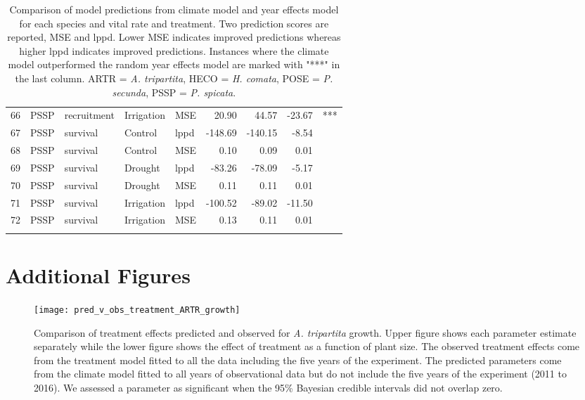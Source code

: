 \documentclass[11pt]{article}
\begin{document}
\begin{longtable}{rllllrrrl}
	66 & PSSP & recruitment & Irrigation & MSE & 20.90 & 44.57 & -23.67 & *** \\ 
	67 & PSSP & survival & Control & lppd & -148.69 & -140.15 & -8.54 &  \\ 
	68 & PSSP & survival & Control & MSE & 0.10 & 0.09 & 0.01 &  \\ 
	69 & PSSP & survival & Drought & lppd & -83.26 & -78.09 & -5.17 &  \\ 
	70 & PSSP & survival & Drought & MSE & 0.11 & 0.11 & 0.01 &  \\ 
	71 & PSSP & survival & Irrigation & lppd & -100.52 & -89.02 & -11.50 &  \\ 
	72 & PSSP & survival & Irrigation & MSE & 0.13 & 0.11 & 0.01 &  \\ 
	\hline
	\caption{Comparison of model predictions from climate model and year effects model for each species and vital rate and treatment.  Two prediction scores are reported, MSE and lppd. Lower MSE indicates improved predictions whereas higher lppd indicates improved predictions.  Instances where the climate model outperformed the random year effects model are marked with "***" in the last column. ARTR = \textit{A. tripartita}, HECO = \textit{H. comata}, POSE = \textit{P. secunda}, PSSP = \textit{P. spicata}.} 
	\label{table:treatmentPreds}
\end{longtable}


\clearpage
\newpage
\clearpage
\newpage
\section{Additional Figures} 

\begin{figure}[!htbp]
	\centering
	\texttt{[image: pred\_v\_obs\_treatment\_ARTR\_growth]}
	\caption{Comparison of treatment effects predicted and observed for \textit{A. tripartita} growth.  Upper figure shows each parameter estimate separately while the lower figure shows the effect of treatment as a function of plant size.  The observed treatment effects come from the treatment model fitted to all the data including the five years of the experiment.  The predicted parameters come from the climate model fitted to all years of observational data but do not include the five years of the experiment (2011 to 2016). We assessed a parameter as significant when the 95\% Bayesian credible intervals did not overlap zero.}
	\label{fig:parPredARTRGrowth}
\end{figure}
\end{document}
